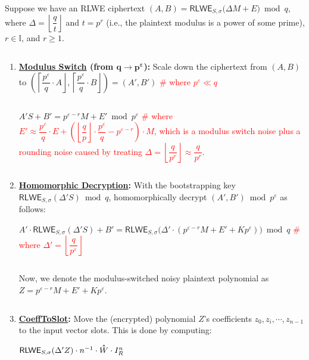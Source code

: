 \begin{tcolorbox}[title={\textbf{\tboxlabel{\ref*{subsubsec:bfv-bootstrapping-summary}} BFV Bootstrapping}}]

Suppose we have an RLWE ciphertext $(A, B)  = \textsf{RLWE}_{S, \sigma}\bm(\Delta M + E\bm) \bmod q$, where $\Delta = \left\lfloor\dfrac{q}{t}\right\rfloor$ and $t = p^r$ (i.e., the plaintext modulus is a power of some prime), $r \in \mathbb{I}$, and $r \geq 1$. 

$ $

\begin{enumerate}
\item \textbf{\underline{Modulus Switch} (from $\bm{q \rightarrow p^\varepsilon}$):} Scale down the ciphertext from $(A, B)$ to $\left(\left\lceil \dfrac{p^\varepsilon}{q}\cdot A\right\rfloor, \left\lceil \dfrac{p^\varepsilon}{q}\cdot B\right\rfloor\right) = (A', B')$ \textcolor{red}{ \# where $p^\varepsilon \ll q$} 

$ $

$A'S + B' = p^{\varepsilon-r}M + E' \bmod p^\varepsilon$ \textcolor{red}{ \# where $E' \approx \dfrac{p^\varepsilon}{q}\cdot E  + \left(\left\lfloor\dfrac{q}{p}\right\rfloor\cdot\dfrac{p^\varepsilon}{q} - p^{\varepsilon-r}\right)\cdot M$, which is a modulus switch noise plus a rounding noise caused by treating $\Delta=\left\lfloor\dfrac{q}{p^r}\right\rfloor \approx \dfrac{q}{p^r}$.}

$ $

\item \textbf{\underline{Homomorphic Decryption}:} With the bootstrapping key $\textsf{RLWE}_{S, \sigma}(\Delta' S) \bmod q$, homomorphically decrypt $(A', B') \bmod p^\varepsilon$ as follows:

$A' \cdot \textsf{RLWE}_{S, \sigma}(\Delta' S)  + B' = \textsf{RLWE}_{S, \sigma}\bm(\Delta' \cdot (p^{\varepsilon-r} M + E' + Kp^\varepsilon)\bm) \bmod q$ \textcolor{red}{ \# where $\Delta' = \left\lfloor\dfrac{q}{p^\varepsilon}\right\rfloor$}

$ $

Now, we denote the modulus-switched noisy plaintext polynomial as $Z = p^{\varepsilon-r} M + E' + Kp^\varepsilon$.

$ $

\item \textbf{\textsf{\underline{CoeffToSlot}}:} Move the (encrypted) polynomial $Z$'s coefficients $z_0, z_i, \cdots, z_{n-1}$ to the input vector slots. This is done by computing: 

$\textsf{RLWE}_{S, \sigma}(\Delta' Z) \cdot n^{-1}\cdot \hathat{W}\cdot I_R^n$


\end{enumerate}
\end{tcolorbox}
